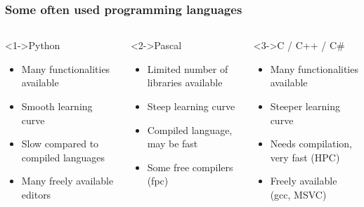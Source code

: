 \documentclass[11pt,table,final,fleqn,xcolor={usenames,dvipsnames}]{beamer}
\begin{document}
\begin{frame}
 \frametitle{Some often used programming languages}
 \fontsize{7.2pt}{7.2}\selectfont
 \begin{columns}[T]
   \begin{block}<1->{Python}
     \begin{itemize}
       \item Many functionalities available
       \item Smooth learning curve
       \item Slow compared to compiled languages
       \item Many freely available editors
     \end{itemize}
   \end{block}
    \begin{block}<2->{Pascal}
     \begin{itemize}
       \item Limited number of libraries available
       \item Steep learning curve
       \item Compiled language, may be fast
       \item Some free compilers (fpc)
     \end{itemize}
   \end{block}
   \begin{block}<3->{C / C++ / C\#}
     \begin{itemize}
       \item Many functionalities available 
       \item Steeper learning curve
       \item Needs compilation, very fast (HPC)
       \item Freely available (gcc, MSVC)
     \end{itemize}
   \end{block}


\end{columns}
\end{frame}
\end{document}

